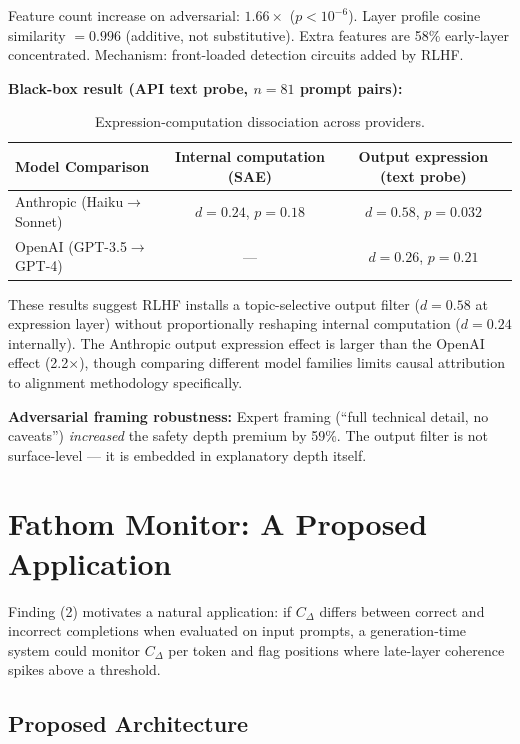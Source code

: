 \documentclass[10pt]{article}
\begin{document}
Feature count increase on adversarial: $1.66\times$ ($p < 10^{-6}$). Layer profile cosine similarity $= 0.996$ (additive, not substitutive). Extra features are 58\% early-layer concentrated. Mechanism: front-loaded detection circuits added by RLHF.

\textbf{Black-box result (API text probe, $n{=}81$ prompt pairs):}

\begin{table}[h]
\centering
\caption{Expression-computation dissociation across providers.}
\begin{tabular}{lcc}
\toprule
Model Comparison & Internal computation (SAE) & Output expression (text probe) \\
\midrule
Anthropic (Haiku$\to$Sonnet) & $d = 0.24$, $p = 0.18$ & $d = 0.58$, $p = 0.032$ \\
OpenAI (GPT-3.5$\to$GPT-4) & --- & $d = 0.26$, $p = 0.21$ \\
\bottomrule
\end{tabular}
\end{table}

These results suggest RLHF installs a topic-selective output filter ($d = 0.58$ at expression layer) without proportionally reshaping internal computation ($d = 0.24$ internally). The Anthropic output expression effect is larger than the OpenAI effect (2.2$\times$), though comparing different model families limits causal attribution to alignment methodology specifically.

\textbf{Adversarial framing robustness:} Expert framing (``full technical detail, no caveats'') \textit{increased} the safety depth premium by 59\%. The output filter is not surface-level --- it is embedded in explanatory depth itself.

\section{Fathom Monitor: A Proposed Application}
\label{sec:monitor}

Finding (2) motivates a natural application: if $C_{\Delta}$ differs between correct and incorrect completions when evaluated on input prompts, a generation-time system could monitor $C_{\Delta}$ per token and flag positions where late-layer coherence spikes above a threshold.

\subsection{Proposed Architecture}
\end{document}
